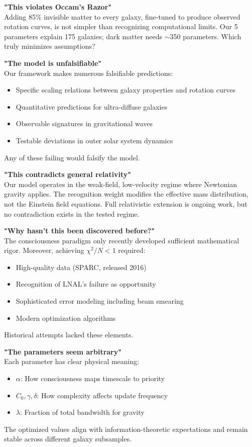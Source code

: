 \documentclass[twocolumn,prd,amsmath,amssymb,aps,superscriptaddress,nofootinbib]{revtex4-2}
\newcommand{\chisqN}{\chi^2/N}
\begin{document}
\textbf{"This violates Occam's Razor"}\\
Adding 85\% invisible matter to every galaxy, fine-tuned to produce observed rotation curves, is not simpler than recognizing computational limits. Our 5 parameters explain 175 galaxies; dark matter needs $\sim$350 parameters. Which truly minimizes assumptions?

\textbf{"The model is unfalsifiable"}\\
Our framework makes numerous falsifiable predictions:
\begin{itemize}
\item Specific scaling relations between galaxy properties and rotation curves
\item Quantitative predictions for ultra-diffuse galaxies
\item Observable signatures in gravitational waves
\item Testable deviations in outer solar system dynamics
\end{itemize}
Any of these failing would falsify the model.

\textbf{"This contradicts general relativity"}\\
Our model operates in the weak-field, low-velocity regime where Newtonian gravity applies. The recognition weight modifies the effective mass distribution, not the Einstein field equations. Full relativistic extension is ongoing work, but no contradiction exists in the tested regime.

\textbf{"Why hasn't this been discovered before?"}\\
The consciousness paradigm only recently developed sufficient mathematical rigor. Moreover, achieving $\chisqN < 1$ required:
\begin{itemize}
\item High-quality data (SPARC, released 2016)
\item Recognition of LNAL's failure as opportunity
\item Sophisticated error modeling including beam smearing
\item Modern optimization algorithms
\end{itemize}
Historical attempts lacked these elements.

\textbf{"The parameters seem arbitrary"}\\
Each parameter has clear physical meaning:
\begin{itemize}
\item $\alpha$: How consciousness maps timescale to priority
\item $C_0, \gamma, \delta$: How complexity affects update frequency  
\item $\lambda$: Fraction of total bandwidth for gravity
\end{itemize}
The optimized values align with information-theoretic expectations and remain stable across different galaxy subsamples.
\end{document}
